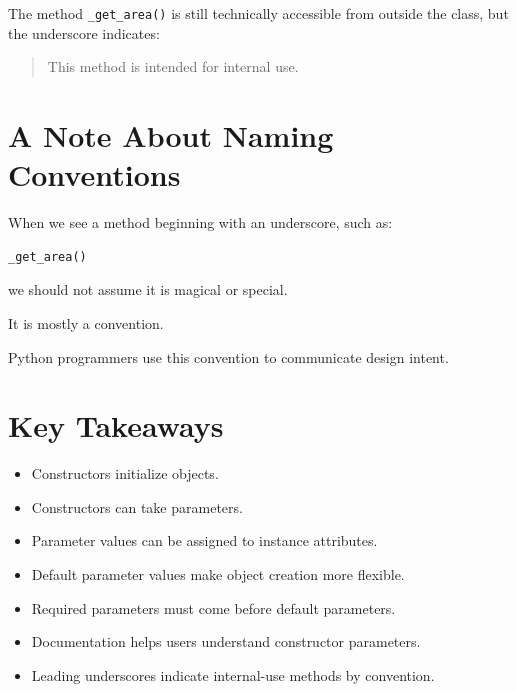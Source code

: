 \documentclass[11pt]{article}
\begin{document}
The method \verb|_get_area()| is still technically accessible from outside the class, but the underscore indicates:

\begin{quote}
This method is intended for internal use.
\end{quote}

\section{A Note About Naming Conventions}

When we see a method beginning with an underscore, such as:

\begin{lstlisting}[language=Python]
_get_area()
\end{lstlisting}

we should not assume it is magical or special.

It is mostly a convention.

Python programmers use this convention to communicate design intent.

\section{Key Takeaways}

\begin{itemize}
    \item Constructors initialize objects.
    \item Constructors can take parameters.
    \item Parameter values can be assigned to instance attributes.
    \item Default parameter values make object creation more flexible.
    \item Required parameters must come before default parameters.
    \item Documentation helps users understand constructor parameters.
    \item Leading underscores indicate internal-use methods by convention.
\end{itemize}
\end{document}
